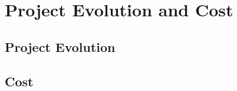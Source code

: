 \chapter{Project Evolution and Cost}
\label{chap:evolution}

\section{Project Evolution}
\label{section:evolution}

\section{Cost}

